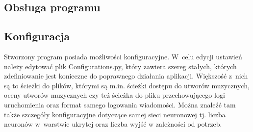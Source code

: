 \begin{appendices}
\section{Obsługa programu}
\subsection{Konfiguracja}
Stworzony program posiada możliwości konfiguracyjne. W~celu edycji ustawień należy edytować plik Configurations.py, który zawiera szereg stałych, których zdefiniowanie jest konieczne do poprawnego działania aplikacji. Większość z~nich są to ścieżki do plików, którymi są m.in. ścieżki dostępu do utworów muzycznych, oceny utworów muzycznych czy też ścieżka do pliku przechowującego logi uruchomienia oraz format samego logowania wiadomości. Można znaleźć tam także szczegóły konfiguracyjne dotyczące samej sieci neuronowej tj. liczba neuronów w~warstwie ukrytej oraz liczba wyjść w zależności od potrzeb. 


\end{appendices}
